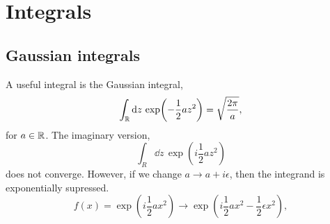 \section{Integrals}
\subsection{Gaussian integrals}
\label{section:gaussian integrals}
A useful integral is the Gaussian integral,
\begin{equation}
    \int_{\mathbb{R}} \dd z \, \exp(- \frac{1}{2} a z^2) = \sqrt{\frac{2 \pi}{a}},
\end{equation}
for $a \in \mathbb{R}$. The imaginary version,
\begin{equation}
    \int_R \dd z \, \exp(i \frac{1}{2} a z^2 )
\end{equation}
does not converge. However, if we change $a \rightarrow a + i\epsilon$, 
then the integrand is exponentially supressed.
\begin{equation}
    f(x) = \exp(i \frac{1}{2}a x^2) \rightarrow
    \exp(i\frac{1}{2}a x^2 - \frac{1}{2} \epsilon  x^2),
\end{equation}
